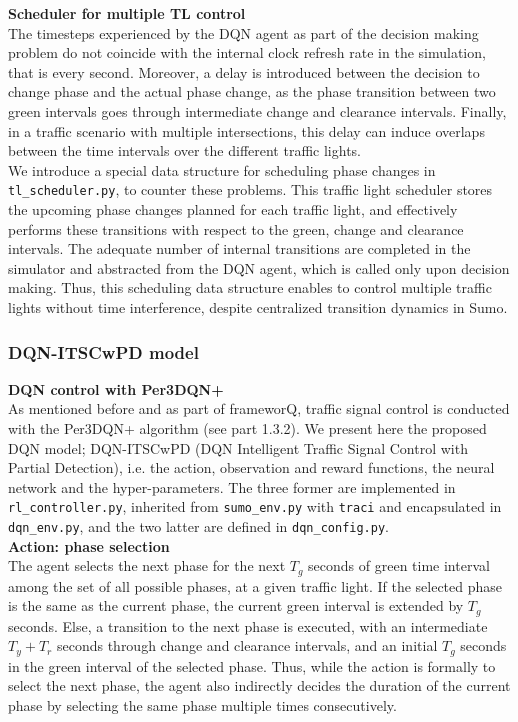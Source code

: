 \textbf{Scheduler for multiple TL control} \\
The timesteps experienced by the DQN agent as part of the decision making problem do not coincide with the internal clock refresh rate in the simulation, that is every second. Moreover, a delay is introduced between the decision to change phase and the actual phase change, as the phase transition between two green intervals goes through intermediate change and clearance intervals. Finally, in a traffic scenario with multiple intersections, this delay can induce overlaps between the time intervals over the different traffic lights. \\
We introduce a special data structure for scheduling phase changes in \texttt{
tl\_scheduler.py}, to counter these problems. This traffic light scheduler stores the upcoming phase changes planned for each traffic light, and effectively performs these transitions with respect to the green, change and clearance intervals. The adequate number of internal transitions are completed in the simulator and abstracted from the DQN agent, which is called only upon decision making. Thus, this scheduling data structure enables to control multiple traffic lights without time interference, despite centralized transition dynamics in Sumo.

\subsubsection{DQN-ITSCwPD model}

\textbf{DQN control with Per3DQN+} \\
As mentioned before and as part of frameworQ, traffic signal control is conducted with the Per3DQN+ algorithm (see part 1.3.2). We present here the proposed DQN model; DQN-ITSCwPD (DQN Intelligent Traffic Signal Control with Partial Detection), i.e. the action, observation and reward functions, the neural network and the hyper-parameters. The three former are implemented in \texttt{rl\_controller.py}, inherited from \texttt{sumo\_env.py} with \texttt{traci} and encapsulated in \texttt{dqn\_env.py}, and the two latter are defined in \texttt{dqn\_config.py}.\\

\textbf{Action: phase selection} \\
The agent selects the next phase for the next $T_g$ seconds of green time interval among the set of all possible phases, at a given traffic light. If the selected phase is the same as the current phase, the current green interval is extended by $T_g$ seconds. Else, a transition to the next phase is executed, with an intermediate $T_y + T_r$ seconds through change and clearance intervals, and an initial $T_g$ seconds in the green interval of the selected phase. Thus, while the action is formally to select the next phase, the agent also indirectly decides the duration of the current phase by selecting the same phase multiple times consecutively. \\

